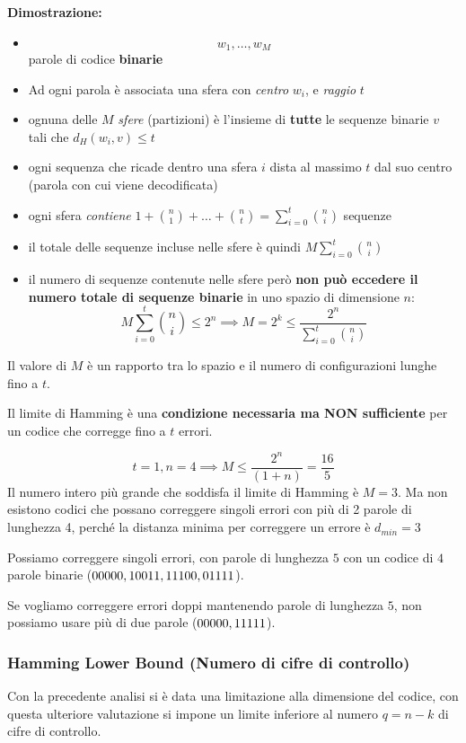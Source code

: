 \textbf{Dimostrazione:}
\begin{itemize}
    \item $$w_1,\dots, w_M$$ parole di codice \textbf{binarie}
    \item Ad ogni parola è associata una sfera con \textit{centro} $w_i$, e \textit{raggio} $t$
    \item ognuna delle $M$ \textit{sfere} (partizioni) è l'insieme di \textbf{tutte} le sequenze binarie $v$ tali che $d_H(w_i, v) \leq t$
    \item ogni sequenza che ricade dentro una sfera $i$ dista al massimo $t$ dal suo centro (parola con cui viene decodificata)
    \item ogni sfera \textit{contiene} $1+ \binom{n}{1}+\dots+\binom{n}{t}=\sum_{i=0}^t\binom{n}{i}$ sequenze
    \item  il totale delle sequenze incluse nelle sfere è quindi $M\sum_{i=0}^t\binom{n}{i}$
    \item il numero di sequenze contenute nelle sfere però \textbf{non può eccedere il numero totale di sequenze binarie} in uno spazio di dimensione $n$:
    \[ M\sum_{i=0}^t \binom{n}{i} \leq 2^n
    \implies
    M=2^k\leq \frac{2^n}{\sum_{i=0}^t\binom{n}{i}}\]
\end{itemize}
Il valore di $M$ è un rapporto tra lo spazio e il numero di configurazioni lunghe fino a $t$.

Il limite di Hamming è una \textbf{condizione necessaria ma NON sufficiente} per un codice che corregge fino a $t$ errori.
\begin{esempio}{}
\[t=1,n=4 \implies M\leq \frac{2^n}{(1+n)}= \frac{16}{5}\]
Il numero intero più grande che soddisfa il limite di Hamming è $M=3$. Ma non esistono codici che possano correggere singoli errori con più di 2 parole di lunghezza 4, perché la distanza minima per correggere un errore è $d_{min}=3$
\end{esempio}

\begin{esempio}{}
    Possiamo correggere singoli errori, con parole di lunghezza $5$ con un codice di $4$ parole binarie ($00000,\space 10011,\space 11100,\space 01111$).
\end{esempio}
\begin{esempio}{}
    Se vogliamo correggere errori doppi mantenendo parole di lunghezza $5$, non possiamo usare più di due parole ($00000,\space 11111$).
\end{esempio}


\subsubsection{Hamming Lower Bound (Numero di cifre di controllo)} %
Con la precedente analisi si è data una limitazione alla dimensione del codice, con questa ulteriore valutazione si impone un limite inferiore al numero $q=n-k$ di cifre di controllo.

